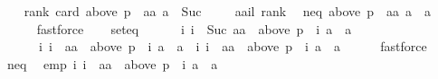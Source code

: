 \begin{isabellebody}
\ \ \isamarkupfalse%
\ rank{}{\isacharcolon}{\kern0pt}\ {\isachardoublequoteopen}card\ {\isacharparenleft}{\kern0pt}above\ {\isacharparenleft}{\kern0pt}p\ {\isacharbang}{\kern0pt}\ aa{\isacharparenright}{\kern0pt}\ a{\isacharparenright}{\kern0pt}\ {\isasymnoteq}\ Suc\ {}{\isachardoublequoteclose}\isanewline
\ \ \isamarkupfalse%
\ aail\ rank{}\ \isamarkupfalse%
\ neq{\isacharcolon}{\kern0pt}\ {\isachardoublequoteopen}above\ {\isacharparenleft}{\kern0pt}p\ {\isacharbang}{\kern0pt}\ aa{\isacharparenright}{\kern0pt}\ a\ {\isasymnoteq}\ {\isacharbraceleft}{\kern0pt}a{\isacharbraceright}{\kern0pt}{\isachardoublequoteclose}\isanewline
\ \ \ \ \isamarkupfalse%
\ fastforce\isanewline
\ \ \isamarkupfalse%
\ seteq{\isacharcolon}{\kern0pt}\isanewline
\ \ \ \ \ \ {\isachardoublequoteopen}{\isacharbraceleft}{\kern0pt}i{\isachardot}{\kern0pt}\ i\ {\isacharless}{\kern0pt}\ Suc\ aa\ {\isasymand}\ above\ {\isacharparenleft}{\kern0pt}p\ {\isacharbang}{\kern0pt}\ i{\isacharparenright}{\kern0pt}\ a\ {\isacharequal}{\kern0pt}\ {\isacharbraceleft}{\kern0pt}a{\isacharbraceright}{\kern0pt}{\isacharbraceright}{\kern0pt}\isanewline
\ \ \ \ \ \ {\isacharequal}{\kern0pt}{\isacharbraceleft}{\kern0pt}i{\isachardot}{\kern0pt}\ i\ {\isacharless}{\kern0pt}\ aa\ {\isasymand}\ above\ {\isacharparenleft}{\kern0pt}p\ {\isacharbang}{\kern0pt}\ i{\isacharparenright}{\kern0pt}\ a\ {\isacharequal}{\kern0pt}\ {\isacharbraceleft}{\kern0pt}a{\isacharbraceright}{\kern0pt}{\isacharbraceright}{\kern0pt}\ {\isasymunion}\ {\isacharbraceleft}{\kern0pt}i{\isachardot}{\kern0pt}\ i\ {\isacharequal}{\kern0pt}\ aa\ {\isasymand}\ above\ {\isacharparenleft}{\kern0pt}p\ {\isacharbang}{\kern0pt}\ i{\isacharparenright}{\kern0pt}\ a\ {\isacharequal}{\kern0pt}\ {\isacharbraceleft}{\kern0pt}a{\isacharbraceright}{\kern0pt}{\isacharbraceright}{\kern0pt}{\isachardoublequoteclose}\isanewline
\ \ \ \ \isamarkupfalse%
\ fastforce\isanewline
\ \ \isamarkupfalse%
\ neq\ \isamarkupfalse%
\ emp{\isacharcolon}{\kern0pt}\ {\isachardoublequoteopen}{\isacharbraceleft}{\kern0pt}i{\isachardot}{\kern0pt}\ i\ {\isacharequal}{\kern0pt}\ aa\ {\isasymand}\ above\ {\isacharparenleft}{\kern0pt}p\ {\isacharbang}{\kern0pt}\ i{\isacharparenright}{\kern0pt}\ a\ {\isacharequal}{\kern0pt}\ {\isacharbraceleft}{\kern0pt}a{\isacharbraceright}{\kern0pt}{\isacharbraceright}{\kern0pt}\ {\isacharequal}{\kern0pt}\ {\isacharbraceleft}{\kern0pt}{\isacharbraceright}{\kern0pt}{\isachardoublequoteclose}\ \isamarkupfalse%

\end{isabellebody}
